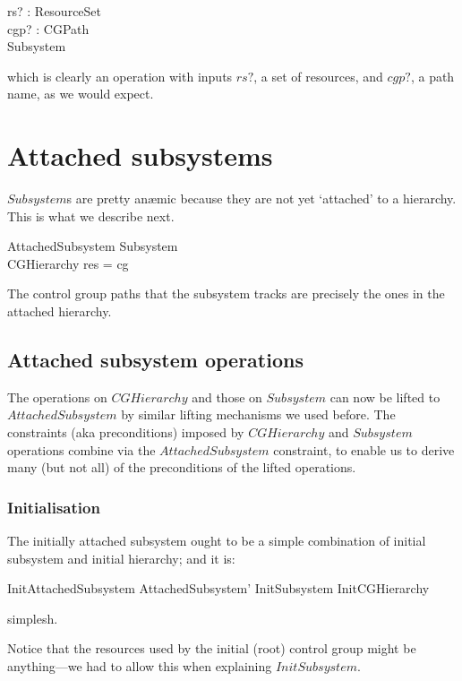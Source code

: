 \documentclass[a4paper,twoside,12pt]{article}
\begin{document}
\begin{schema*}
rs? : ResourceSet\\
cgp? : CGPath\\
\Delta Subsystem
\end{schema*}
which is clearly an operation with inputs $rs?$, a set of resources, and $cgp?$, a path name, as we would expect.

\section{Attached subsystems}
$Subsystem$s are pretty an\ae{}mic because they are not yet `attached' to a hierarchy. This is what we describe next.

\begin{schema}{AttachedSubsystem}
Subsystem \\
CGHierarchy
\where
\dom res = \dom cg
\end{schema}
The control group paths that the subsystem tracks are precisely the ones in
the attached hierarchy. 

\subsection{Attached subsystem operations}
The operations on $CGHierarchy$ and those on $Subsystem$ can now be lifted to $AttachedSubsystem$
by similar lifting mechanisms we used before. The constraints (aka preconditions) imposed 
by $CGHierarchy$ and $Subsystem$ operations combine via the
$AttachedSubsystem$ constraint, to enable us to derive many (but not all) of the preconditions of the lifted operations.

\subsubsection{Initialisation}

The initially attached subsystem ought to be a simple combination of initial subsystem and initial hierarchy; and it is:

\begin{zed}
InitAttachedSubsystem  AttachedSubsystem' \land InitSubsystem \land InitCGHierarchy
\end{zed}
simplesh.

Notice that the resources used by the initial (root) control group might be anything---we had to allow this when
explaining $InitSubsystem$.
\end{document}
